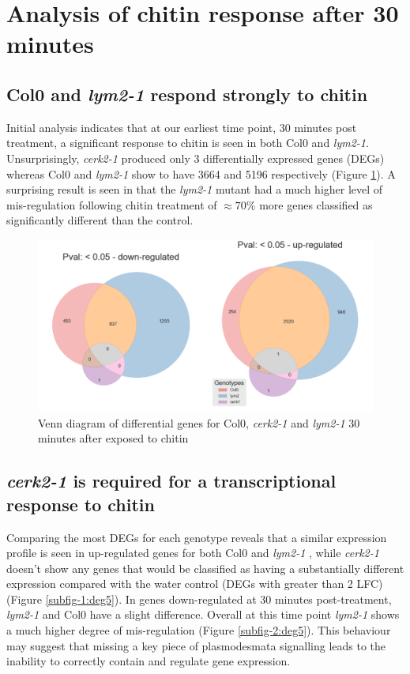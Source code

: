 \documentclass[../main.tex]{subfiles}
\begin{document}
\section{Analysis of chitin response after 30 minutes}
\label{sec:seqresults}

\subsection{Col0 and \textit{lym2-1} respond strongly to chitin}

Initial analysis indicates that at our earliest time point, 30 minutes post
treatment, a significant response to chitin is seen in both Col0 and
\textit{lym2-1}. Unsurprisingly, \textit{cerk2-1} produced only 3 differentially
expressed genes (DEGs) whereas Col0 and \textit{lym2-1} show to have 3664 and
5196 respectively (Figure \ref{fig:05hrDEGs}). A surprising result is seen in that the
\textit{lym2-1} mutant had a much higher level of mis-regulation following
chitin treatment of $\approx70\%$ more genes classified as significantly different
than the control.

\begin{figure}[ht]
  \centering
  \includegraphics[width=0.6\columnwidth]{figures/vennTreatmentschitin.png}
  \caption{\label{fig:05hrDEGs} Venn diagram of differential genes for Col0,
    \textit{cerk2-1} and \textit{lym2-1} 30 minutes after exposed to chitin}
\end{figure}

\subsection{\textit{cerk2-1} is required for a transcriptional response to chitin}

Comparing the most DEGs for each genotype reveals that a similar expression
profile is seen in up-regulated genes for both Col0 and \textit{lym2-1} , while
\textit{cerk2-1} doesn't show any genes that would be classified as having a
substantially different expression compared with the water control (DEGs with
greater than 2 LFC) (Figure \ref{subfig-1:deg5}). In genes down-regulated at 30
minutes post-treatment, \textit{lym2-1} and Col0 have a slight difference.
Overall at this time point \textit{lym2-1} shows a much higher degree of
mis-regulation (Figure \ref{subfig-2:deg5}). This behaviour may suggest that
missing a key piece of plasmodesmata signalling leads to the inability to
correctly contain and regulate gene expression.
\end{document}
